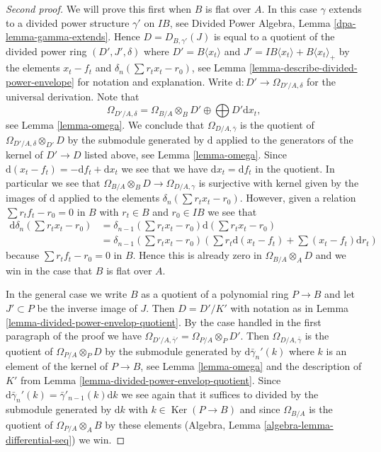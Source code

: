 \documentclass{stacks-project}
\theoremstyle{plain}
\theoremstyle{definition}
\theoremstyle{remark}
\numberwithin{equation}{subsection}
\def\Ker{\mathop{\mathrm{Ker}}}
\begin{document}
\begin{proof}[Second proof]
We will prove this first when $B$ is flat over $A$. In this case $\gamma$
extends to a divided power structure $\gamma'$ on $IB$, see
Divided Power Algebra, Lemma \ref{dpa-lemma-gamma-extends}.
Hence $D = D_{B, \gamma'}(J)$ is equal to a quotient of
the divided power ring $(D', J', \delta)$ where $D' =  B\langle x_t \rangle$
and $J' = IB\langle x_t \rangle + B\langle x_t \rangle_{+}$
by the elements $x_t - f_t$ and $\delta_n(\sum r_t x_t - r_0)$, see
Lemma \ref{lemma-describe-divided-power-envelope} for notation
and explanation. Write $\text{d} : D' \to \Omega_{D'/A, \delta}$
for the universal derivation. Note that
$$
\Omega_{D'/A, \delta} =
\Omega_{B/A} \otimes_B D' \oplus \bigoplus D' \text{d}x_t,
$$
see Lemma \ref{lemma-omega}. We conclude that $\Omega_{D/A, \bar\gamma}$
is the quotient of $\Omega_{D'/A, \delta} \otimes_{D'} D$ by the submodule
generated by $\text{d}$ applied to the generators of the
kernel of $D' \to D$ listed above, see Lemma \ref{lemma-omega}.
Since $\text{d}(x_t - f_t) = - \text{d}f_t + \text{d}x_t$
we see that we have $\text{d}x_t = \text{d}f_t$ in the quotient.
In particular we see that $\Omega_{B/A} \otimes_B D \to \Omega_{D/A, \gamma}$
is surjective with kernel given by the images of $\text{d}$
applied to the elements $\delta_n(\sum r_t x_t - r_0)$.
However, given a relation $\sum r_tf_t - r_0 = 0$ in $B$ with
$r_t \in B$ and $r_0 \in IB$ we see that
\begin{align*}
\text{d}\delta_n(\sum r_t x_t - r_0)
& =
\delta_{n - 1}(\sum r_t x_t - r_0)\text{d}(\sum r_t x_t - r_0)
\\
& =
\delta_{n - 1}(\sum r_t x_t - r_0)
\left(
\sum r_t\text{d}(x_t - f_t) + \sum (x_t - f_t)\text{d}r_t
\right)
\end{align*}
because $\sum r_tf_t - r_0 = 0$ in $B$. Hence this is already zero in
$\Omega_{B/A} \otimes_A D$ and we win in the case that $B$ is flat over $A$.

\medskip\noindent
In the general case we write $B$ as a quotient of a polynomial ring
$P \to B$ and let $J' \subset P$ be the inverse image of $J$. Then
$D = D'/K'$ with notation as in
Lemma \ref{lemma-divided-power-envelop-quotient}.
By the case handled in the first paragraph of the proof we have
$\Omega_{D'/A, \bar\gamma'} = \Omega_{P/A} \otimes_P D'$. Then
$\Omega_{D/A, \bar \gamma}$ is the quotient of $\Omega_{P/A} \otimes_P D$
by the submodule generated by $\text{d}\bar\gamma_n'(k)$ where $k$
is an element of the kernel of $P \to B$, see
Lemma \ref{lemma-omega} and the description of $K'$ from
Lemma \ref{lemma-divided-power-envelop-quotient}. Since
$\text{d}\bar\gamma_n'(k) = \bar\gamma'_{n - 1}(k)\text{d}k$ we see
again that it suffices to divided by the submodule generated by
$\text{d}k$ with $k \in \Ker(P \to B)$ and since $\Omega_{B/A}$
is the quotient of $\Omega_{P/A} \otimes_A B$ by these elements
(Algebra, Lemma \ref{algebra-lemma-differential-seq}) we win.
\end{proof}
\end{document}
